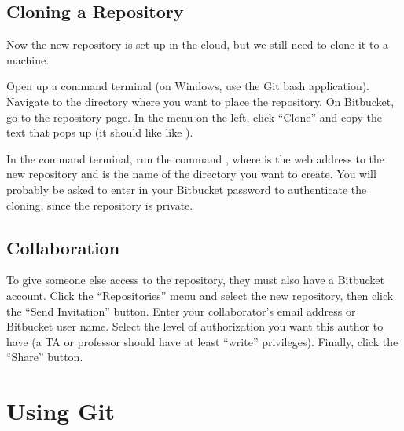 \subsection*{Cloning a Repository} %

Now the new repository is set up in the cloud, but we still need to clone it to a machine.

Open up a command terminal (on Windows, use the Git bash application).
Navigate to the directory where you want to place the repository.
On Bitbucket, go to the repository page.
In the menu on the left, click ``Clone'' and copy the text that pops up (it should like like ).

In the command terminal, run the command
, where  is the web address to the new repository and  is the name of the directory you want to create.
You will probably be asked to enter in your Bitbucket password to authenticate the cloning, since the repository is private.
% 

\subsection*{Collaboration} %

To give someone else access to the repository, they must also have a Bitbucket account.
Click the ``Repositories'' menu and select the new repository, then click the ``Send Invitation'' button.
Enter your collaborator's email address or Bitbucket user name. %
Select the level of authorization you want this author to have (a TA or professor should have at least ``write'' privileges).
Finally, click the ``Share'' button.

\section*{Using Git} %

